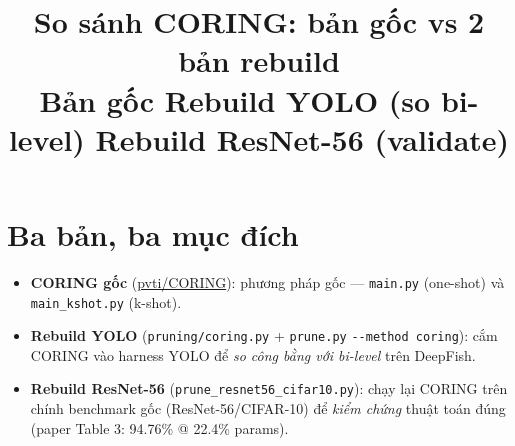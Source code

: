\documentclass[11pt,a4paper]{article}
\title{\textbf{So sánh CORING: bản gốc vs 2 bản rebuild}\\
\large Bản gốc \textperiodcentered{} Rebuild YOLO (so bi-level) \textperiodcentered{} Rebuild ResNet-56 (validate)}
\author{}
\date{}
\newcommand{\code}[1]{\texttt{#1}}
\begin{document}
\maketitle
\vspace{-2em}

\section{Ba bản, ba mục đích}
\begin{itemize}
  \item \textbf{CORING gốc} (\href{https://github.com/pvti/CORING}{pvti/CORING}): phương pháp gốc
        --- \code{main.py} (one-shot) và \code{main\_kshot.py} (k-shot).
  \item \textbf{Rebuild YOLO} (\code{pruning/coring.py} + \code{prune.py} \code{-{}-method coring}):
        cắm CORING vào harness YOLO để \emph{so công bằng với bi-level} trên DeepFish.
  \item \textbf{Rebuild ResNet-56} (\code{prune\_resnet56\_cifar10.py}): chạy lại CORING trên chính
        benchmark gốc (ResNet-56/CIFAR-10) để \emph{kiểm chứng} thuật toán đúng (paper Table 3:
        94.76\% @ 22.4\% params).
\end{itemize}

\end{document}
